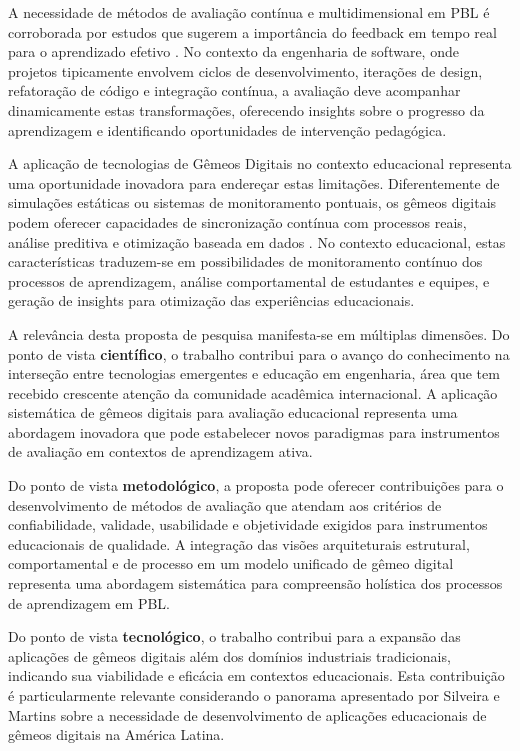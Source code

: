 \documentclass[12pt,a4paper]{article}
\begin{document}
A necessidade de métodos de avaliação contínua e multidimensional em PBL é corroborada por estudos que sugerem a importância do feedback em tempo real para o aprendizado efetivo \cite{thomas2000}. No contexto da engenharia de software, onde projetos tipicamente envolvem ciclos de desenvolvimento, iterações de design, refatoração de código e integração contínua, a avaliação deve acompanhar dinamicamente estas transformações, oferecendo insights sobre o progresso da aprendizagem e identificando oportunidades de intervenção pedagógica.

A aplicação de tecnologias de Gêmeos Digitais no contexto educacional representa uma oportunidade inovadora para endereçar estas limitações. Diferentemente de simulações estáticas ou sistemas de monitoramento pontuais, os gêmeos digitais podem oferecer capacidades de sincronização contínua com processos reais, análise preditiva e otimização baseada em dados \cite{grieves2014, tao2018}. No contexto educacional, estas características traduzem-se em possibilidades de monitoramento contínuo dos processos de aprendizagem, análise comportamental de estudantes e equipes, e geração de insights para otimização das experiências educacionais.

A relevância desta proposta de pesquisa manifesta-se em múltiplas dimensões. Do ponto de vista \textbf{científico}, o trabalho contribui para o avanço do conhecimento na interseção entre tecnologias emergentes e educação em engenharia, área que tem recebido crescente atenção da comunidade acadêmica internacional. A aplicação sistemática de gêmeos digitais para avaliação educacional representa uma abordagem inovadora que pode estabelecer novos paradigmas para instrumentos de avaliação em contextos de aprendizagem ativa.

Do ponto de vista \textbf{metodológico}, a proposta pode oferecer contribuições para o desenvolvimento de métodos de avaliação que atendam aos critérios de confiabilidade, validade, usabilidade e objetividade exigidos para instrumentos educacionais de qualidade. A integração das visões arquiteturais estrutural, comportamental e de processo em um modelo unificado de gêmeo digital representa uma abordagem sistemática para compreensão holística dos processos de aprendizagem em PBL.

Do ponto de vista \textbf{tecnológico}, o trabalho contribui para a expansão das aplicações de gêmeos digitais além dos domínios industriais tradicionais, indicando sua viabilidade e eficácia em contextos educacionais. Esta contribuição é particularmente relevante considerando o panorama apresentado por Silveira e Martins \cite{silveira2024panorama} sobre a necessidade de desenvolvimento de aplicações educacionais de gêmeos digitais na América Latina.
\end{document}
